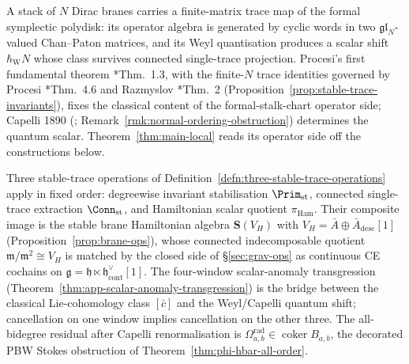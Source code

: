 \documentclass[11pt]{memoir}
\begin{document}
A stack of \(N\) Dirac branes carries a finite-matrix trace map of the
formal symplectic polydisk: its operator algebra is generated by
cyclic words in two \(\mathfrak{gl}_N\)-valued Chan--Paton matrices, and
its Weyl quantisation produces a scalar shift \(\hbar_{\mathrm{W}}N\) whose class
  survives connected single-trace projection.  Procesi's first
fundamental theorem \cite{procesi}*{Thm.~1.3}, with the finite-\(N\)
trace identities governed by Procesi \cite{procesi}*{Thm.~4.6} and
Razmyslov \cite{razmyslov}*{Thm.~2}
(Proposition~\ref{prop:stable-trace-invariants}),
fixes the classical
content of the formal-stalk-chart operator side; Capelli
1890 (\cite{capelli}\cite{howe-capelli};
Remark~\ref{rmk:normal-ordering-obstruction}) determines the quantum scalar.
Theorem~\ref{thm:main-local} reads its operator side off the
constructions below.

Three stable-trace operations of
Definition~\ref{defn:three-stable-trace-operations} apply in fixed order:
degreewise invariant stabilisation \(\Prim_{\mathrm{st}}\), connected
single-trace extraction \(\Conn_{\mathrm{st}}\), and Hamiltonian scalar
quotient \(\pi_{\mathrm{Ham}}\). Their composite image is the stable
brane Hamiltonian algebra \(\mathbf S(V_H)\) with
\(V_H=\bar A\oplus\bar A_{\mathrm{desc}}[1]\)
(Proposition~\ref{prop:brane-ops}), whose connected indecomposable
quotient \(\mathfrak m/\mathfrak m^2\cong V_H\) is matched by the closed
side of \S\ref{sec:grav-ops} as continuous CE cochains on
\(\mathfrak g=\mathfrak h\ltimes\mathfrak h^\vee_{\mathrm{cont}}[1]\).
The four-window scalar-anomaly transgression
(Theorem~\ref{thm:app-scalar-anomaly-transgression}) is the bridge
between the classical Lie-cohomology class \([\bar c]\) and the
Weyl/Capelli quantum shift; cancellation on one window implies
cancellation on the other three.  The all-bidegree residual after
Capelli renormalisation is
\(\Omega^{\mathrm{rad}}_{a,b}\in\operatorname{coker}B_{a,b}\), the
decorated PBW Stokes obstruction of
Theorem~\ref{thm:phi-hbar-all-order}.
\end{document}
